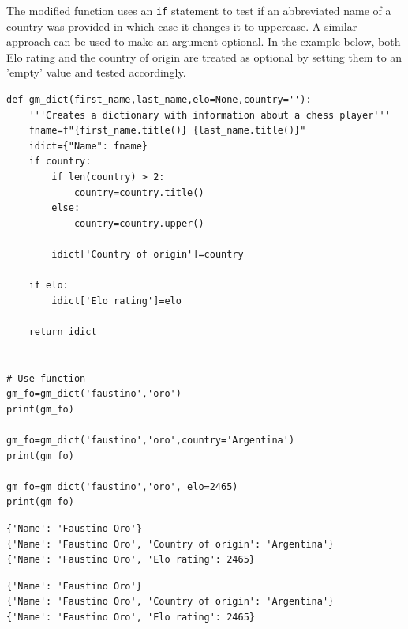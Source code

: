 \documentclass[10pt]{book}
\begin{document}
The modified function uses an \texttt{if} statement to test if an abbreviated name of a country was provided in which case it changes it to uppercase. A similar approach can be used to make an argument optional. In the example below, both Elo rating  and the country of origin are treated as optional by setting them to an 'empty' value and tested accordingly.

\label{org3cb5a02}
\begin{verbatim}
def gm_dict(first_name,last_name,elo=None,country=''):
    '''Creates a dictionary with information about a chess player'''
    fname=f"{first_name.title()} {last_name.title()}"
    idict={"Name": fname}
    if country:
        if len(country) > 2:
            country=country.title()
        else:
            country=country.upper()

        idict['Country of origin']=country

    if elo:
        idict['Elo rating']=elo

    return idict


# Use function
gm_fo=gm_dict('faustino','oro')
print(gm_fo)

gm_fo=gm_dict('faustino','oro',country='Argentina')
print(gm_fo)

gm_fo=gm_dict('faustino','oro', elo=2465)
print(gm_fo)
\end{verbatim}

\label{org614882d}
\begin{verbatim}
{'Name': 'Faustino Oro'}
{'Name': 'Faustino Oro', 'Country of origin': 'Argentina'}
{'Name': 'Faustino Oro', 'Elo rating': 2465}
\end{verbatim}

\label{org013d42a}
\begin{verbatim}
{'Name': 'Faustino Oro'}
{'Name': 'Faustino Oro', 'Country of origin': 'Argentina'}
{'Name': 'Faustino Oro', 'Elo rating': 2465}
\end{verbatim}
\end{document}

